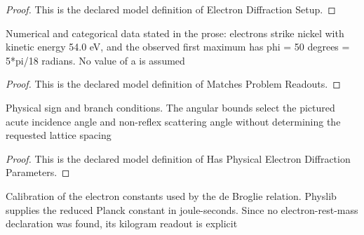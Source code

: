\begin{proof}
  This is the declared model definition of Electron Diffraction Setup.
\end{proof}
\begin{definition}
  \label{def:physics:phyx-mini-0532:phyxminiproblems-problemphyxmini0532-matchesproblemreadouts}
  Numerical and categorical data stated in the prose: electrons strike nickel with kinetic energy 54.0 eV, and the observed first maximum has phi = 50 degrees = 5*pi/18 radians. No value of a is assumed
\end{definition}
\begin{proof}
  This is the declared model definition of Matches Problem Readouts.
\end{proof}
\begin{definition}
  \label{def:physics:phyx-mini-0532:phyxminiproblems-problemphyxmini0532-hasphysicalelectrondiffractionparameters}
  Physical sign and branch conditions. The angular bounds select the pictured acute incidence angle and non-reflex scattering angle without determining the requested lattice spacing
\end{definition}
\begin{proof}
  This is the declared model definition of Has Physical Electron Diffraction Parameters.
\end{proof}
\begin{definition}
  \label{def:physics:phyx-mini-0532:phyxminiproblems-problemphyxmini0532-usesreferenceelectronconstants}
  Calibration of the electron constants used by the de Broglie relation. Physlib supplies the reduced Planck constant in joule-seconds. Since no electron-rest-mass declaration was found, its kilogram readout is explicit
\end{definition}
